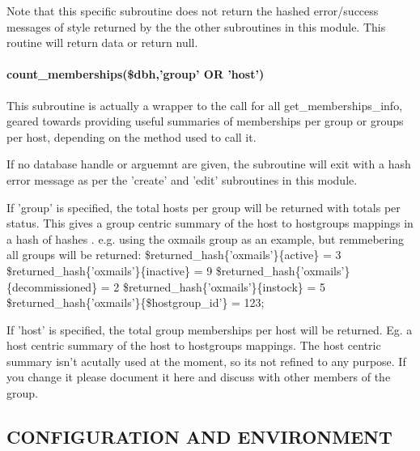 \documentclass{book}
\begin{document}
Note that this specific subroutine does not return the hashed error/success messages of style returned by the the other subroutines in this module. This routine will return data or return null.


\paragraph*{count\protect\_memberships(\$dbh,'group' OR 'host')}
\label{Inventory::Memberships_count_memberships_dbh_group_OR_host_}
\hypertarget{Inventory::Memberships_count_memberships_dbh_group_OR_host_}{}



This subroutine is actually a wrapper to the call for all get\_memberships\_info, geared towards providing useful summaries of memberships per group or groups per host, depending on the method used to call it.



If no database handle or arguemnt are given, the subroutine will exit with a hash error message as per the 'create' and 'edit' subroutines in this module.



If 'group' is specified, the total hosts per group will be returned with totals per status. This gives a group centric summary of the host to hostgroups mappings in a hash of hashes . e.g. using the oxmails group as an example, but remmebering all groups will be returned: \$returned\_hash\{'oxmails'\}\{active\} = 3 \$returned\_hash\{'oxmails'\}\{inactive\} = 9 \$returned\_hash\{'oxmails'\}\{decommissioned\} = 2 \$returned\_hash\{'oxmails'\}\{instock\} = 5 \$returned\_hash\{'oxmails'\}\{\$hostgroup\_id'\} = 123;



If 'host' is specified, the total group memberships per host will be returned. Eg. a host centric summary of the host to hostgroups mappings. The host centric summary isn't acutally used at the moment, so its not refined to any purpose. If you change it please document it here and discuss with other members of the group.


\subsection{CONFIGURATION AND ENVIRONMENT}
\label{Inventory::Memberships_CONFIGURATION_AND_ENVIRONMENT}
\hypertarget{Inventory::Memberships_CONFIGURATION_AND_ENVIRONMENT}{}
\end{document}
